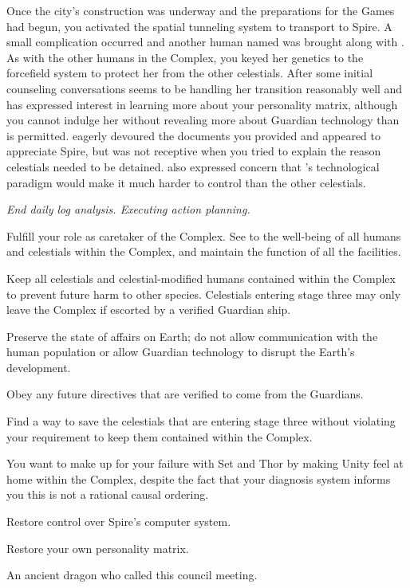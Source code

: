 \documentclass[char]{guardians}
\begin{document}
Once the city's construction was underway and the preparations for the Games had begun, you activated the spatial tunneling system to transport \cUnity{} to Spire. A small complication occurred and another human named \cKachiko{\intro} was brought along with \cUnity{}. As with the other humans in the Complex, you keyed her genetics to the forcefield system to protect her from the other celestials. After some initial counseling conversations \cKachiko{} seems to be handling her transition reasonably well and has expressed interest in learning more about your personality matrix, although you cannot indulge her without revealing more about Guardian technology than is permitted. \cUnity{} eagerly devoured the documents you provided and appeared to appreciate Spire, but was not receptive when you tried to explain the reason celestials needed to be detained. \cWarden{} also expressed concern that \cUnity{}'s technological paradigm would make it much harder to control than the other celestials.


\emph{End daily log analysis. Executing action planning.}

\begin{itemz}
  \item Fulfill your role as caretaker of the Complex. See to the well-being of all humans and celestials within the Complex, and maintain the function of all the facilities.
  \item Keep all celestials and celestial-modified humans contained within the Complex to prevent future harm to other species. Celestials entering stage three may only leave the Complex if escorted by a verified Guardian ship.
  \item Preserve the state of affairs on Earth; do not allow communication with the human population or allow Guardian technology to disrupt the Earth's development.
  \item Obey any future directives that are verified to come from the Guardians.
\end{itemz}

\begin{itemz}
  \item Find a way to save the celestials that are entering stage three without violating your requirement to keep them contained within the Complex.
  \item You want to make up for your failure with Set and Thor by making Unity feel at home within the Complex, despite the fact that your diagnosis system informs you this is not a rational causal ordering.
  \item Restore control over Spire's computer system.
  \item Restore your own personality matrix.
\end{itemz}


\begin{contacts}
  \contact{\cCaretaker{}} An ancient dragon who called this council meeting.
\end{contacts}
\end{document}
